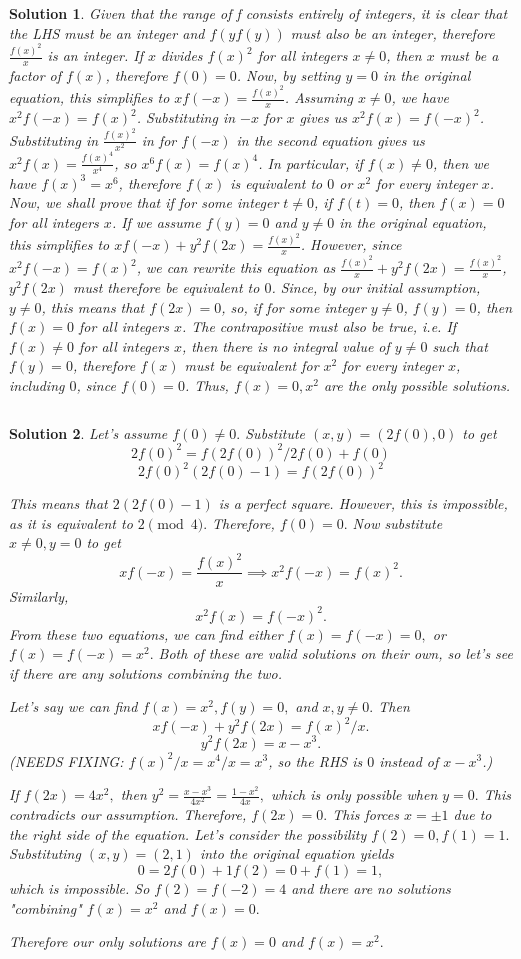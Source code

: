 \documentclass[12pt]{article}
\newtheorem*{solution*}{Solution}
\begin{document}
$$$$
\begin{solution*}
    Given that the range of f consists entirely of integers, it is clear that the LHS must be an integer and $f(yf(y))$ must also be an integer, therefore $\frac{f(x)^2}{x}$ is an integer. If $x$ divides $f(x)^2$ for all integers $x \ne 0$, then $x$ must be a factor of $f(x)$, therefore $f(0)=0$. Now, by setting $y=0$ in the original equation, this simplifies to $xf(-x)=\frac{f(x)^2}{x}$. Assuming $x \ne 0$, we have $x^2f(-x)=f(x)^2$. Substituting in $-x$ for $x$ gives us $x^2f(x)=f(-x)^2$. Substituting in $\frac{f(x)^2}{x^2}$ in for $f(-x)$ in the second equation gives us $x^2f(x)=\frac{f(x)^4}{x^4}$, so $x^6f(x)=f(x)^4$. In particular, if $f(x) \ne 0$, then we have $f(x)^3=x^6$, therefore $f(x)$ is equivalent to $0$ or $x^2$ for every integer $x$. Now, we shall prove that if for some integer $t \ne 0$, if $f(t)=0$, then $f(x)=0$ for all integers $x$. If we assume $f(y)=0$ and $y \ne 0$ in the original equation, this simplifies to $xf(-x)+y^2f(2x)=\frac{f(x)^2}{x}$. However, since $x^2f(-x)=f(x)^2$, we can rewrite this equation as $\frac{f(x)^2}{x}+y^2f(2x)=\frac{f(x)^2}{x}$, $y^2f(2x)$ must therefore be equivalent to $0$. Since, by our initial assumption, $y \ne 0$, this means that $f(2x)=0$, so, if for some integer $y \ne 0$, $f(y)=0$, then $f(x)=0$ for all integers $x$. The contrapositive must also be true, i.e. If $f(x) \ne 0$ for all integers $x$, then there is no integral value of $y \ne 0$ such that $f(y)=0$, therefore $f(x)$ must be equivalent for $x^2$ for every integer $x$, including $0$, since $f(0)=0$. Thus, $f(x)=0, x^2$ are the only possible solutions.

\end{solution*}
$$$$
\begin{solution*}
    Let's assume $f(0)\neq 0.$ Substitute $(x,y)=(2f(0),0)$ to get $$2f(0)^2=f(2f(0))^2/2f(0)+f(0)$$
$$2f(0)^2(2f(0)-1)=f(2f(0))^2$$

This means that $2(2f(0)-1)$ is a perfect square. However, this is impossible, as it is equivalent to $2\pmod{4}.$ Therefore, $f(0)=0.$ Now substitute $x\neq 0, y=0$ to get $$xf(-x)=\frac{f(x)^2}{x} \implies x^2f(-x)=f(x)^2.$$
Similarly, $$x^2f(x)=f(-x)^2.$$
From these two equations, we can find either $f(x)=f(-x)=0,$ or $f(x)=f(-x)=x^2.$ Both of these are valid solutions on their own, so let's see if there are any solutions combining the two. 

Let's say we can find $f(x)=x^2, f(y)=0,$ and $x,y\neq 0.$ Then $$xf(-x)+y^2f(2x)=f(x)^2/x.$$
$$y^2f(2x)=x-x^3.$$ (NEEDS FIXING: $f(x)^2/x= x^4/x = x^3$, so the RHS is $0$ instead of $x-x^3$.)

If $f(2x)=4x^2,$ then $y^2=\frac{x-x^3}{4x^2}=\frac{1-x^2}{4x},$ which is only possible when $y=0.$ This contradicts our assumption. Therefore, $f(2x)=0.$ This forces $x=\pm 1$ due to the right side of the equation. Let's consider the possibility $f(2)=0, f(1)=1.$ Substituting $(x,y)=(2,1)$ into the original equation yields  $$0=2f(0)+1f(2)=0+f(1)=1,$$ which is impossible. So $f(2)=f(-2)=4$ and there are no solutions "combining" $f(x)=x^2$ and $f(x)=0.$

Therefore our only solutions are $\boxed{f(x)=0}$ and $\boxed{f(x)=x^2.}$
\end{solution*}
\end{document}
